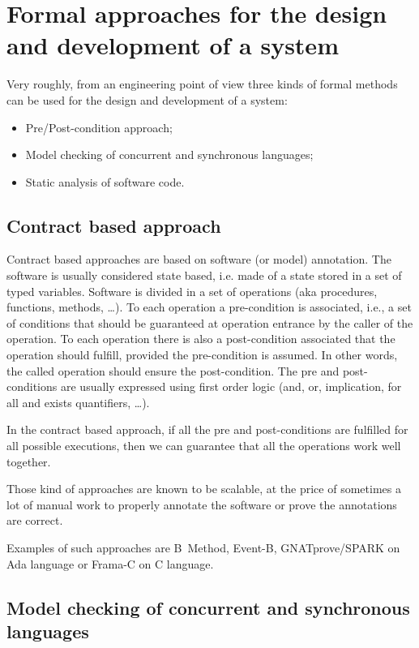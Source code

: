\section{Formal approaches for the design and development of a system}


Very roughly, from an engineering point of view three kinds of formal
methods can be used for the design and development of a system:
\begin{itemize}
\item Pre/Post-condition approach;
\item Model checking of concurrent and synchronous languages;
\item Static analysis of software code.
\end{itemize}

\subsection{Contract based approach}
\label{sec:contr-based-appr}

Contract based approaches are based on software (or model)
annotation. The software is usually considered state based, i.e. made of
a state stored in a set of typed variables.  Software is divided in a
set of operations (aka procedures, functions, methods, \ldots). To each
operation a pre-condition is associated, i.e., a set of conditions that
should be guaranteed at operation entrance by the caller of the
operation. To each operation there is also a post-condition associated
that the operation should fulfill, provided the pre-condition is
assumed. In other words, the called operation should ensure the
post-condition. The pre and post-conditions are usually expressed using
first order logic (and, or, implication, for all and exists quantifiers,
\ldots).

In the contract based approach, if all the pre and post-conditions are
fulfilled for all possible executions, then we can guarantee that all
the operations work well together.

Those kind of approaches are known to be scalable, at the price of
sometimes a lot of manual work to properly annotate the software or
prove the annotations are correct.

Examples of such approaches are B~Method, Event-B, GNATprove/SPARK on
Ada language or Frama-C on C language.

\subsection{Model checking of concurrent and synchronous languages}

